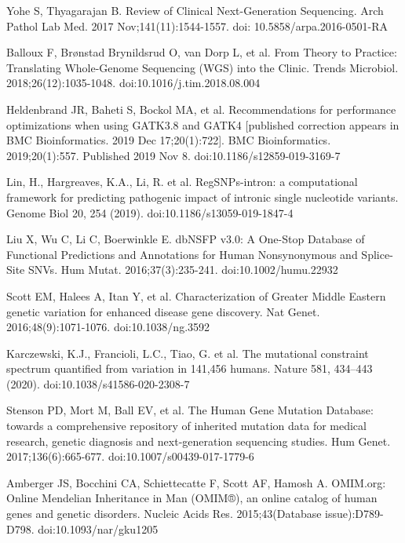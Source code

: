 \documentclass[a4paper,12pt]{article}
\begin{document}
\begin{thebibliography}{100}

Yohe S, Thyagarajan B. Review of Clinical Next-Generation Sequencing. Arch Pathol Lab Med. 2017 Nov;141(11):1544-1557. doi: 10.5858/arpa.2016-0501-RA

Balloux F, Brønstad Brynildsrud O, van Dorp L, et al. From Theory to Practice: Translating Whole-Genome Sequencing (WGS) into the Clinic. Trends Microbiol. 2018;26(12):1035-1048. doi:10.1016/j.tim.2018.08.004

Heldenbrand JR, Baheti S, Bockol MA, et al. Recommendations for performance optimizations when using GATK3.8 and GATK4 [published correction appears in BMC Bioinformatics. 2019 Dec 17;20(1):722]. BMC Bioinformatics. 2019;20(1):557. Published 2019 Nov 8. doi:10.1186/s12859-019-3169-7

Lin, H., Hargreaves, K.A., Li, R. et al. RegSNPs-intron: a computational framework for predicting pathogenic impact of intronic single nucleotide variants. Genome Biol 20, 254 (2019). doi:10.1186/s13059-019-1847-4

Liu X, Wu C, Li C, Boerwinkle E. dbNSFP v3.0: A One-Stop Database of Functional Predictions and Annotations for Human Nonsynonymous and Splice-Site SNVs. Hum Mutat. 2016;37(3):235-241. doi:10.1002/humu.22932

Scott EM, Halees A, Itan Y, et al. Characterization of Greater Middle Eastern genetic variation for enhanced disease gene discovery. Nat Genet. 2016;48(9):1071-1076. doi:10.1038/ng.3592

Karczewski, K.J., Francioli, L.C., Tiao, G. et al. The mutational constraint spectrum quantified from variation in 141,456 humans. Nature 581, 434–443 (2020). doi:10.1038/s41586-020-2308-7

Stenson PD, Mort M, Ball EV, et al. The Human Gene Mutation Database: towards a comprehensive repository of inherited mutation data for medical research, genetic diagnosis and next-generation sequencing studies. Hum Genet. 2017;136(6):665-677. doi:10.1007/s00439-017-1779-6

Amberger JS, Bocchini CA, Schiettecatte F, Scott AF, Hamosh A. OMIM.org: Online Mendelian Inheritance in Man (OMIM®), an online catalog of human genes and genetic disorders. Nucleic Acids Res. 2015;43(Database issue):D789-D798. doi:10.1093/nar/gku1205


\end{thebibliography}
\end{document}
